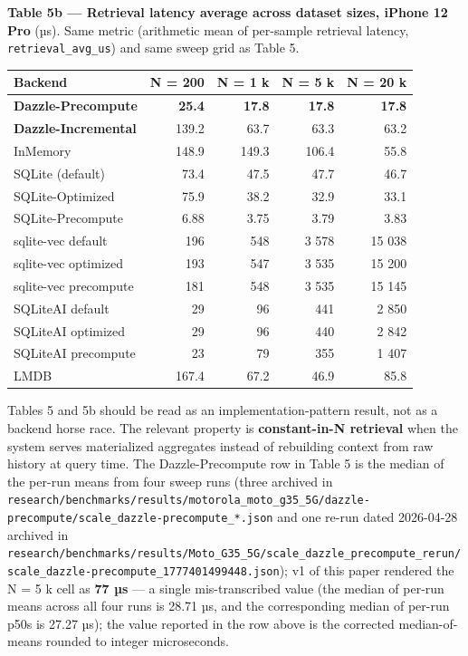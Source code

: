 \textbf{Table 5b --- Retrieval latency average across dataset sizes, iPhone 12
Pro} (µs). Same metric (arithmetic mean of per-sample retrieval latency,
\texttt{retrieval\_avg\_us}) and same sweep grid as Table 5.

{\def\LTcaptype{none} %
\begin{longtable}[]{@{}lrrrr@{}}
\toprule\noalign{}
Backend & N = 200 & N = 1 k & N = 5 k & N = 20 k \\
\midrule\noalign{}
\endhead
\bottomrule\noalign{}
\endlastfoot
\textbf{Dazzle-Precompute} & \textbf{25.4} & \textbf{17.8} & \textbf{17.8} &
\textbf{17.8} \\
\textbf{Dazzle-Incremental} & 139.2 & 63.7 & 63.3 & 63.2 \\
InMemory & 148.9 & 149.3 & 106.4 & 55.8 \\
SQLite (default) & 73.4 & 47.5 & 47.7 & 46.7 \\
SQLite-Optimized & 75.9 & 38.2 & 32.9 & 33.1 \\
SQLite-Precompute & 6.88 & 3.75 & 3.79 & 3.83 \\
sqlite-vec default & 196 & 548 & 3 578 & 15 038 \\
sqlite-vec optimized & 193 & 547 & 3 535 & 15 200 \\
sqlite-vec precompute & 181 & 548 & 3 535 & 15 145 \\
SQLiteAI default & 29 & 96 & 441 & 2 850 \\
SQLiteAI optimized & 29 & 96 & 440 & 2 842 \\
SQLiteAI precompute & 23 & 79 & 355 & 1 407 \\
LMDB & 167.4 & 67.2 & 46.9 & 85.8 \\
\end{longtable}
}

Tables 5 and 5b should be read as an implementation-pattern result, not as a
backend horse race. The relevant property is \textbf{constant-in-N retrieval}
when the system serves materialized aggregates instead of rebuilding context
from raw history at query time. The Dazzle-Precompute row in Table 5 is the
median of the per-run means from four sweep runs (three archived in
\texttt{research/benchmarks/results/motorola\_moto\_g35\_5G/dazzle-precompute/scale\_dazzle-precompute\_*.json}
and one re-run dated 2026-04-28 archived in
\texttt{research/benchmarks/results/Moto\_G35\_5G/scale\_dazzle\_precompute\_rerun/scale\_dazzle-precompute\_1777401499448.json});
v1 of this paper rendered the N = 5 k cell as \textbf{77 µs} --- a single
mis-transcribed value (the median of per-run means across all four runs is 28.71
µs, and the corresponding median of per-run p50s is 27.27 µs); the value
reported in the row above is the corrected median-of-means rounded to integer
microseconds.

